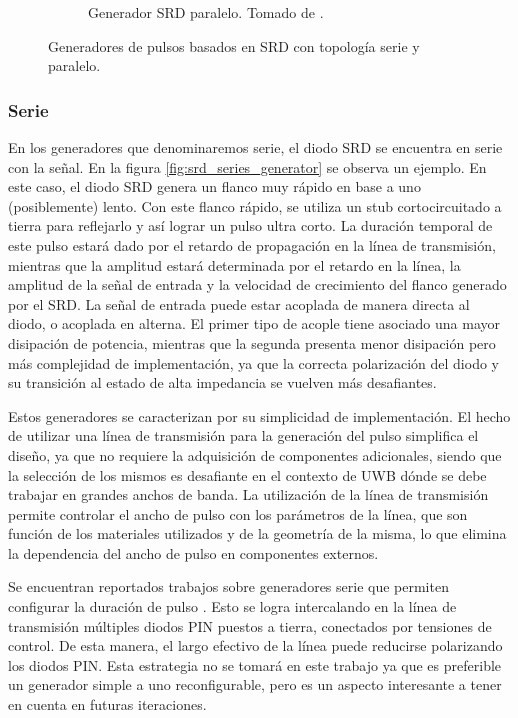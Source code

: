 \begin{figure}
\begin{subfigure}[b]{0.45\textwidth}
        \caption{Generador SRD paralelo. Tomado de \cite{han2005}.}
        \label{fig:srd_shunt_generator}
    \end{subfigure}
    \caption{Generadores de pulsos basados en SRD con topología serie y
    paralelo.}
    \label{fig:srd_pulse_generator_topologies}
\end{figure}

\subsubsection{Serie}

En los generadores que denominaremos serie, el diodo SRD se encuentra en serie
con la señal. En la figura \ref{fig:srd_series_generator} se observa un ejemplo.
En este caso, el diodo SRD genera un flanco muy rápido en base a uno
(posiblemente) lento. Con este flanco rápido, se utiliza un stub cortocircuitado
a tierra para reflejarlo y así lograr un pulso ultra corto. La duración temporal
de este pulso estará dado por el retardo de propagación en la línea de
transmisión, mientras que la amplitud estará determinada por el retardo en la
línea, la amplitud de la señal de entrada y la velocidad de crecimiento del
flanco generado por el SRD. La señal de entrada puede estar acoplada de manera
directa al diodo, o acoplada en alterna. El primer tipo de acople tiene asociado
una mayor disipación de potencia, mientras que la segunda presenta menor
disipación pero más complejidad de implementación, ya que la correcta
polarización del diodo y su transición al estado de alta impedancia se vuelven
más desafiantes.

Estos generadores se caracterizan por su simplicidad de implementación. El hecho
de utilizar una línea de transmisión para la generación del pulso simplifica el
diseño, ya que no requiere la adquisición de componentes adicionales, siendo que
la selección de los mismos es desafiante en el contexto de UWB dónde se debe
trabajar en grandes anchos de banda. La utilización de la línea de transmisión
permite controlar el ancho de pulso con los parámetros de la línea, que son
función de los materiales utilizados y de la geometría de la misma, lo que
elimina la dependencia del ancho de pulso en componentes externos.

Se encuentran reportados trabajos sobre generadores serie que permiten
configurar la duración de pulso \cite{Zhang2006}. Esto se logra intercalando en
la línea de transmisión múltiples diodos PIN puestos a tierra, conectados por
tensiones de control. De esta manera, el largo efectivo de la línea puede
reducirse polarizando los diodos PIN. Esta estrategia no se tomará en este
trabajo ya que es preferible un generador simple a uno reconfigurable, pero es
un aspecto interesante a tener en cuenta en futuras iteraciones.

